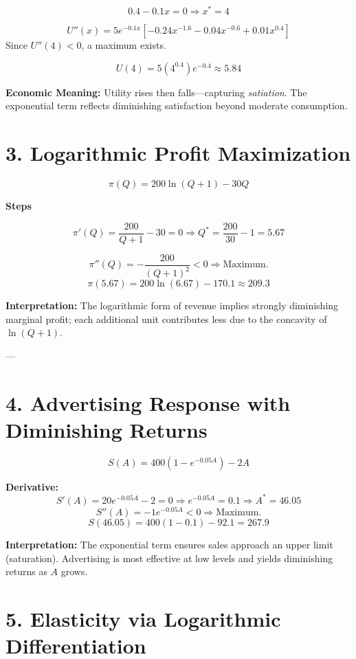 \documentclass[12pt]{article}
\begin{document}
\[
0.4-0.1x=0 \Rightarrow x^*=4
\]

\[
U''(x)=5e^{-0.1x}\!\left[-0.24x^{-1.6}-0.04x^{-0.6}+0.01x^{0.4}\right]
\]
Since \(U''(4)<0\), a maximum exists.

\[
U(4)=5(4^{0.4})e^{-0.4}\approx5.84
\]

\textbf{Economic Meaning:}  
Utility rises then falls—capturing \textit{satiation}. The exponential term reflects diminishing satisfaction beyond moderate consumption.



\section*{3. Logarithmic Profit Maximization}

\[
\pi(Q)=200\ln(Q+1)-30Q
\]

\textbf{Steps}

\[
\pi'(Q)=\frac{200}{Q+1}-30=0
\Rightarrow Q^*=\frac{200}{30}-1=5.67
\]

\[
\pi''(Q)=-\frac{200}{(Q+1)^2}<0 \Rightarrow \text{Maximum.}
\]
\[
\pi(5.67)=200\ln(6.67)-170.1\approx209.3
\]

\begin{tcolorbox}
\textbf{Interpretation:} The logarithmic form of revenue implies strongly diminishing marginal profit; each additional unit contributes less due to the concavity of $\ln(Q+1)$.
\end{tcolorbox}

---

\section*{4. Advertising Response with Diminishing Returns}

\[
S(A)=400(1-e^{-0.05A})-2A
\]

\textbf{Derivative:}
\[
S'(A)=20e^{-0.05A}-2=0\Rightarrow e^{-0.05A}=0.1\Rightarrow A^*=46.05
\]
\[
S''(A)=-1e^{-0.05A}<0\Rightarrow \text{Maximum.}
\]
\[
S(46.05)=400(1-0.1)-92.1=267.9
\]

\textbf{Interpretation:}  
The exponential term ensures sales approach an upper limit (saturation). Advertising is most effective at low levels and yields diminishing returns as $A$ grows.



\section*{5. Elasticity via Logarithmic Differentiation}
\end{document}
